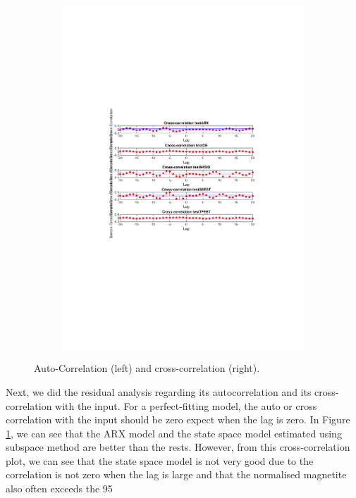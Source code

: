 \documentclass[]{article}
\begin{document}
\begin{figure}[ht]
\begin{subfigure}{.49\textwidth}
	\includegraphics[trim= 10cm 8cm 10cm 8cm, scale=0.4]{figures/cross-corr-1step.pdf}
\end{subfigure}
\caption{Auto-Correlation (left) and cross-correlation (right).}
\label{fig:correlations}
\end{figure}

Next, we did the residual analysis regarding its autocorrelation and its cross-correlation with the input. For a perfect-fitting model, the auto or cross correlation with the input should be zero expect when the lag is zero. In Figure \ref{fig:correlations}, we can see that the ARX model and the state space model estimated using subspace method are better than the rests. However, from this cross-correlation plot, we can see that the state space model is not very good due to the correlation is not zero when the lag is large and that the normalised magnetite also often exceeds the 95%
\end{document}
